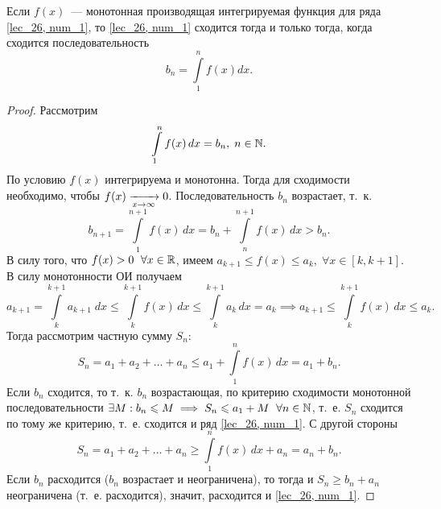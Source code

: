 \documentclass[../../main.tex]{subfiles}
\begin{document}
	\begin{thm} \label{lec27,integral_att}
		Если $f(x)$~--- монотонная производящая интегрируемая функция для ряда 
		\eqref{lec_26, num_1}, то \eqref{lec_26, num_1} сходится тогда и только 
		тогда, когда сходится последовательность \[b_n = \int\limits_1^n f(x)dx.\]
		\begin{proof}
			Рассмотрим
			\[ \int\limits_1^n f(x) \, dx = b_n , \; n \in \mathbb{N}.  \]
			По условию $f(x)$ интегрируема и монотонна. Тогда для сходимости 
			необходимо, чтобы $f(x) \xrightarrow[x\to\infty]{}0$.
			Последовательность $b_n$ возрастает, т.~к.
			\[ b_{n+1} = \int\limits_{1}^{n+1} f(x) \, dx  = b_n + 
			\int\limits_{n}^{n+1} f(x) \, dx > 
			b_n. \]
			В силу того, что $f(x) > 0 \ \; \forall x \in \mathbb{R}$,
			имеем $a_{k+1} \le f(x) \le a_k, \; \forall x \in [k,k+1]$.
			В силу монотонности ОИ получаем
			\[ a_{k+1} = \int\limits_{k}^{k+1}a_{k+1} \; dx  \le 
			\int\limits_{k}^{k+1}f(x) \, dx \le 
			\int\limits_{k}^{k+1}a_{k} \, dx  = a_{k} \implies a_{k+1} \le 
			\int\limits_{k}^{k+1}f(x) \, dx \le a_k. \]
			Тогда рассмотрим частную сумму $S_n$:
			\[ S_n = a_1 + a_2 + \dots + a_n \le a_1 +  \int\limits_{1}^{n}f(x) \, dx  
			= a_1 + 
			b_n. \]
			Если $b_n$ сходится, то т.~к. $b_n$ возрастающая, по критерию сходимости 
			монотонной последовательности $\exists M : b_n \leqslant M \implies S_n \leqslant a_1 + 
			M \ \; 
			\forall n \in \mathbb{N}$, т.~е. $S_n$ сходится по тому же критерию, т.~е. сходится 
			и ряд \eqref{lec_26, num_1}. С другой стороны
			\[ S_n = a_1 + a_2 + \dots + a_n \ge \int\limits_{1}^{n}f(x) \, dx  + a_n = 
			a_n + b_n. \]
			Если $b_n$ расходится ($b_n$ возрастает и неограничена), то тогда и $S_n 
			\ge 
			b_n + a_n$ неограничена (т.~е. расходится), значит, расходится и 
			\eqref{lec_26, num_1}.
		\end{proof}
	\end{thm}
\end{document}
